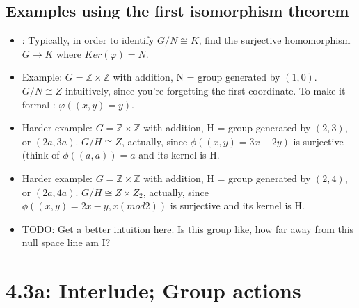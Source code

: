 \documentclass[11pt, oneside]{article}   	%
\begin{document}
\subsection{Examples using the first isomorphism theorem}
\begin{itemize}
\item: Typically, in order to identify $G/N \cong K$, find the surjective homomorphism $G \rightarrow K$ where $Ker(\varphi) = N$.
\item Example: $G = \mathbb{Z} \times \mathbb{Z}$ with addition, N = group generated by $(1,0)$.  $G/N \cong Z$ intuitively, since you're forgetting the first coordinate.  To make it formal : $\varphi((x,y) = y)$.  
\item Harder example: $G = \mathbb{Z} \times \mathbb{Z}$ with addition, H = group generated by $(2,3)$, or $(2a, 3a)$.  $G/H \cong Z$, actually, since $\phi((x,y) = 3x - 2y)$ is surjective (think of $\phi((a, a)) = a$ and its kernel is H.
\item Harder example: $G = \mathbb{Z} \times \mathbb{Z}$ with addition, H = group generated by $(2,4)$, or $(2a, 4a)$.  $G/H \cong Z \times Z_2$, actually, since $\phi((x,y) = 2x  - y, x (mod 2))$ is surjective and its kernel is H.
\item TODO: Get a better intuition here.  Is this group like, how far away from this null space line am I?
\end{itemize}

\section{4.3a: Interlude; Group actions}
\end{document}
